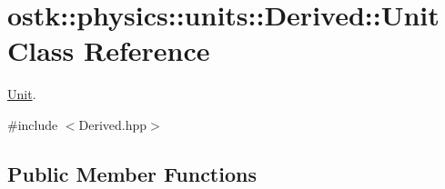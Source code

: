 \hypertarget{classostk_1_1physics_1_1units_1_1_derived_1_1_unit}{}\section{ostk\+:\+:physics\+:\+:units\+:\+:Derived\+:\+:Unit Class Reference}
\label{classostk_1_1physics_1_1units_1_1_derived_1_1_unit}


\hyperlink{classostk_1_1physics_1_1units_1_1_derived_1_1_unit}{Unit}.  




{\ttfamily \#include $<$Derived.\+hpp$>$}

\subsection*{Public Member Functions}
